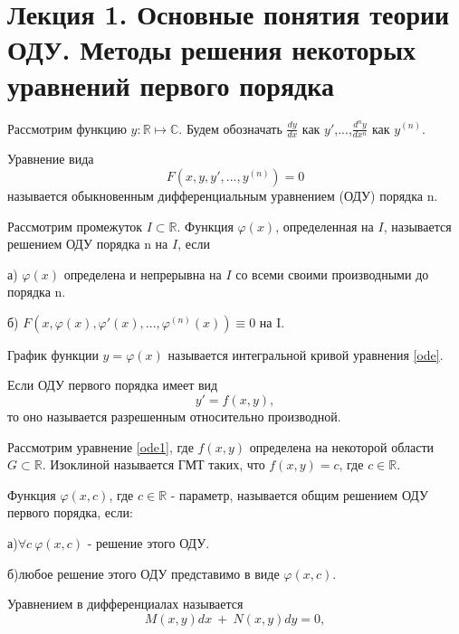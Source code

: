 \documentclass[document.tex]{subfiles}
\begin{document}
\section*{Лекция 1. Основные понятия теории ОДУ. Методы решения некоторых уравнений первого порядка}
Рассмотрим функцию $y:\mathbb{R}\mapsto\mathbb{C}$. Будем обозначать $\frac{dy}{dx}$ как $y'$,...,$\frac{d^ny}{dx^n}$ как $y^{(n)}$.
\begin{definition}
Уравнение вида
\begin{equation}
F(x,y,y',...,y^{(n)})=0 
\label{ode}
\end{equation}  называется обыкновенным дифференциальным уравнением (ОДУ) порядка n.
\end{definition}
\begin{definition}
Рассмотрим промежуток $I \subset \mathbb{R}$. Функция $\varphi(x)$, определенная на $I$, называется решением ОДУ порядка n на $I$, если


а) $\varphi(x)$ определена и непрерывна  на $I$ со всеми своими производными до порядка n.


б) $F(x,\varphi(x),\varphi'(x),...,\varphi^{(n)}(x))\equiv0$ на I.
\end{definition}
\begin{definition}
График функции $y=\varphi(x)$ называется интегральной кривой уравнения \ref{ode}.
\end{definition}
Если ОДУ первого порядка имеет вид 
\begin{equation}
y'=f(x,y), \label{ode1}
\end{equation}то оно называется разрешенным относительно производной.
\begin{definition}
Рассмотрим уравнение \ref{ode1}, где $f(x,y)$ определена на некоторой области $G \subset \mathbb{R}$. Изоклиной называется ГМТ таких, что $f(x,y)=c$, где $c \in \mathbb{R}$.
\end{definition}
\begin{definition}
Функция $\varphi(x,c)$, где $c \in \mathbb{R}$ - параметр, называется общим решением ОДУ первого порядка, если:

а)$\forall c\ \varphi(x,c)$ - решение этого ОДУ.

б)любое решение этого ОДУ представимо в виде $\varphi(x,c)$.
\end{definition}
\begin{definition}
Уравнением в дифференциалах называется 
\begin{equation}
M(x,y)dx\ +\ N(x,y)dy=0, \label{odedif}
\end{equation}
\end{definition}
\end{document}
